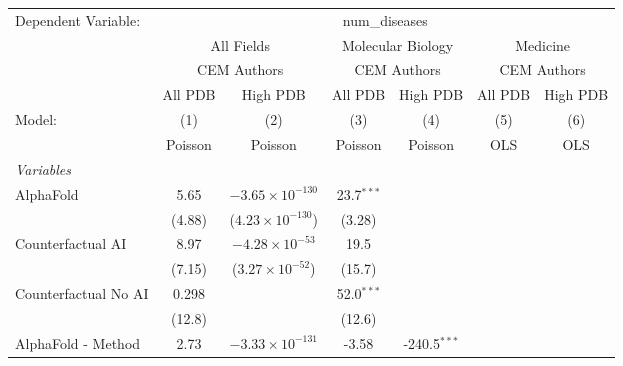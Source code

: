 \begingroup
\centering
\begin{tabular}{lcccccc}
   \tabularnewline \midrule \midrule
   Dependent Variable: & \multicolumn{6}{c}{num\_diseases}\\
 & \multicolumn{2}{c}{All Fields} & \multicolumn{2}{c}{Molecular Biology} & \multicolumn{2}{c}{Medicine} \\
\cmidrule(lr){2-3} \cmidrule(lr){4-5} \cmidrule(lr){6-7}
 & \multicolumn{2}{c}{CEM Authors} & \multicolumn{2}{c}{CEM Authors} & \multicolumn{2}{c}{CEM Authors} \\
\cmidrule(lr){2-3} \cmidrule(lr){4-5} \cmidrule(lr){6-7}
 & \multicolumn{1}{c}{All PDB} & \multicolumn{1}{c}{High PDB} & \multicolumn{1}{c}{All PDB} & \multicolumn{1}{c}{High PDB} & \multicolumn{1}{c}{All PDB} & \multicolumn{1}{c}{High PDB} \\
\cmidrule(lr){2-2} \cmidrule(lr){3-3} \cmidrule(lr){4-4} \cmidrule(lr){5-5} \cmidrule(lr){6-6} \cmidrule(lr){7-7}
   Model:                                                  & (1)        & (2)                       & (3)           & (4)            & (5)  & (6)\\  
                                                           &  Poisson   & Poisson                   & Poisson       & Poisson        & OLS  & OLS\\  
   \midrule
   \emph{Variables}\\
   AlphaFold                                               & 5.65       & $-3.65\times 10^{-130}$   & 23.7$^{***}$  &                &      &   \\   
                                                           & (4.88)     & ($4.23\times 10^{-130}$)  & (3.28)        &                &      &   \\   
   Counterfactual AI                                       & 8.97       & $-4.28\times 10^{-53}$    & 19.5          &                &      &   \\   
                                                           & (7.15)     & ($3.27\times 10^{-52}$)   & (15.7)        &                &      &   \\   
   Counterfactual No AI                                    & 0.298      &                           & 52.0$^{***}$  &                &      &   \\   
                                                           & (12.8)     &                           & (12.6)        &                &      &   \\   
   AlphaFold - Method                                      & 2.73       & $-3.33\times 10^{-131}$   & -3.58         & -240.5$^{***}$ &      &   \\   

\end{tabular}
